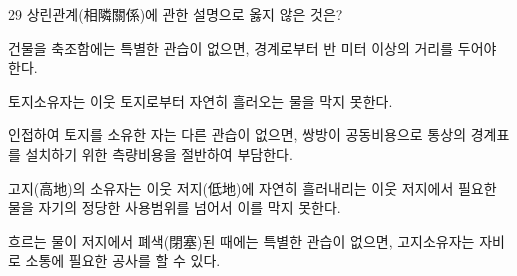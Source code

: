 \begin{question}{29}
상린관계(相隣關係)에 관한 설명으로 옳지 않은 것은?
\begin{choices}
  \item 건물을 축조함에는 특별한 관습이 없으면, 경계로부터 반 미터 이상의 거리를 두어야 한다.
  \item 토지소유자는 이웃 토지로부터 자연히 흘러오는 물을 막지 못한다.
  \item 인접하여 토지를 소유한 자는 다른 관습이 없으면, 쌍방이 공동비용으로 통상의 경계표를 설치하기 위한 측량비용을 절반하여 부담한다.
  \item 고지(高地)의 소유자는 이웃 저지(低地)에 자연히 흘러내리는 이웃 저지에서 필요한 물을 자기의 정당한 사용범위를 넘어서 이를 막지 못한다.
  \item 흐르는 물이 저지에서 폐색(閉塞)된 때에는 특별한 관습이 없으면, 고지소유자는 자비로 소통에 필요한 공사를 할 수 있다.
\end{choices}
\end{question}

